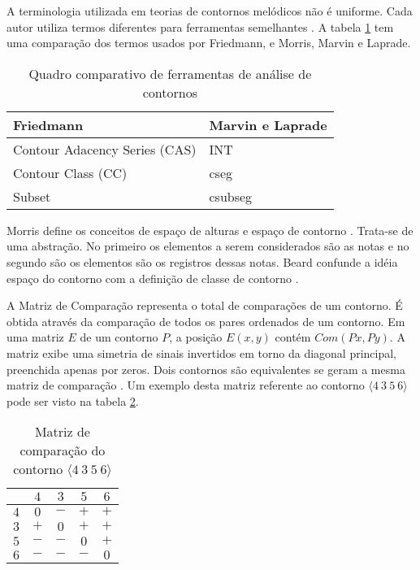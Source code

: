 \documentclass[12pt,brazil]{book}
\begin{document}
A terminologia utilizada em teorias de contornos melódicos não é
uniforme. Cada autor utiliza termos diferentes para ferramentas
semelhantes \cite{friedmann87:response}. A tabela
\ref{tab:compara-ferramentas} tem uma comparação dos termos usados por
Friedmann, e Morris, Marvin e Laprade.

\begin{table}
  \centering
  \begin{tabular}{l|l}
    Friedmann & Marvin e Laprade \\ \hline
    Contour Adacency Series (CAS) & INT \\
    Contour Class (CC) & cseg \\
    Subset & csubseg 
  \end{tabular}
  \caption{Quadro comparativo de ferramentas de análise de contornos}
  \label{tab:compara-ferramentas}
\end{table}

Morris define os conceitos de espaço de alturas e espaço de contorno
\cite{morris87:composition}. Trata-se de uma abstração. No primeiro os
elementos a serem considerados são as notas e no segundo são os
elementos são os registros dessas notas. Beard confunde a idéia espaço
do contorno com a definição de classe de contorno
\cite[p. 11]{beard03:contour}.

A Matriz de Comparação representa o total de comparações de um
contorno. É obtida através da comparação de todos os pares ordenados
de um contorno. Em uma matriz $E$ de um contorno $P$, a posição $E
(x,y)$ contém $Com (Px,Py)$. A matriz exibe uma simetria de sinais
invertidos em torno da diagonal principal, preenchida apenas por
zeros. Dois contornos são equivalentes se geram a mesma matriz de
comparação \cite[p. 28]{morris87:composition}. Um exemplo desta matriz
referente ao contorno $\langle 4\:3\:5\:6 \rangle$ pode ser visto na
tabela \ref{tab:matriz-4356}.

\begin{table}
  \centering
  \begin{tabular}{r|cccc}
    & $4$ & $3$ & $5$ & $6$ \\
    \hline
    $4$ & $0$ & $-$ & $+$ & $+$ \\
    $3$ & $+$ & $0$ & $+$ & $+$ \\
    $5$ & $-$ & $-$ & $0$ & $+$ \\
    $6$ & $-$ & $-$ & $-$ & $0$ \\
  \end{tabular}
  \caption{Matriz de comparação do contorno $\langle 4\:3\:5\:6 \rangle$}
\label{tab:matriz-4356}
\end{table}
\end{document}

